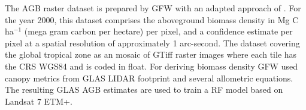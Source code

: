 			
			The \ac{AGB} raster dataset is prepared by \ac{GFW} with an adapted approach of \citeauthor{Baccini2012} \citep{Baccini2012,Baccini2015,Baccini2017}. For the year 2000, this dataset comprises the aboveground biomass density in Mg C ha$^{-1}$ (mega gram carbon per hectare) per pixel, and a confidence estimate per pixel at a spatial resolution of approximately 1 arc-second. The dataset covering the global tropical zone as an mosaic of \ac{GTiff} raster images where each tile has the \ac{CRS} \ac{WGS84} and is coded in float. For deriving biomass density \ac{GFW} used canopy metrics from \ac{GLAS} \ac{LIDAR} footprint and several allometric equations. The resulting \ac{GLAS} \ac{AGB} estimates are used to train a \ac{RF} model based on Landsat 7 \ac{ETM+}.

